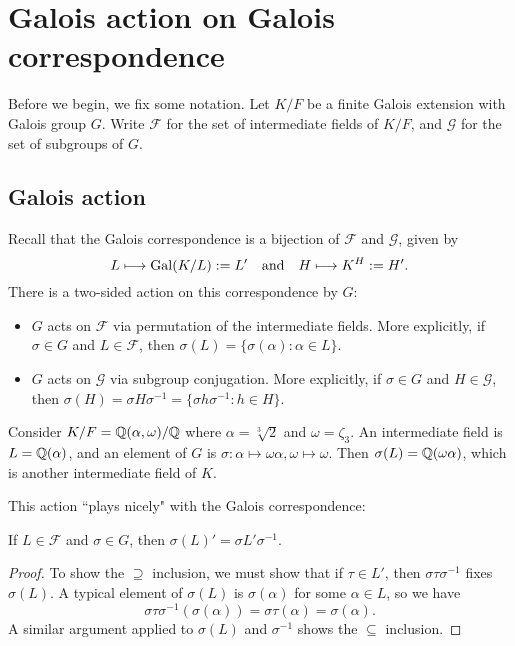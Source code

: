 \chapter{Galois action on Galois correspondence}

Before we begin, we fix some notation. Let $K/F$ be a finite Galois extension with Galois group $G$. Write $\mathcal{F}$ for the set of intermediate fields of $K/F$, and $\mathcal{G}$ for the set of subgroups of $G$.

\section{Galois action}

Recall that the Galois correspondence is a bijection of $\mathcal{F}$ and $\mathcal{G}$, given by
\[
    L \longmapsto \operatorname{Gal}(K/L) := L' \quad \text{and} \quad H \longmapsto K^H := H'.
\]
There is a two-sided action on this correspondence by $G$:
\begin{itemize}
    \item $G$ acts on $\mathcal{F}$ via permutation of the intermediate fields. More explicitly, if $\sigma \in G$ and $L \in \mathcal{F}$, then $\sigma(L) = \{\sigma(\alpha): \alpha \in L\}$.
    \item $G$ acts on $\mathcal{G}$ via subgroup conjugation. More explicitly, if $\sigma \in G$ and $H \in \mathcal{G}$, then $\sigma(H) = \sigma H \sigma^{-1} = \{\sigma h \sigma^{-1}: h \in H\}$.
\end{itemize}

\begin{example}
\label{exmp_gal_action_on_field}
    Consider $K/F = \mathbb{{Q}}(\alpha, \omega)/\mathbb{{Q}}$ where $\alpha = \sqrt[3]{2}$ and $\omega = \zeta_3$. An intermediate field is $L = \mathbb{{Q}}(\alpha)$, and an element of $G$ is $\sigma: \alpha \mapsto \omega \alpha, \omega \mapsto \omega$. Then $\sigma(L) = \mathbb{{Q}}(\omega \alpha)$, which is another intermediate field of $K$.
\end{example}

This action ``plays nicely" with the Galois correspondence:

\begin{proposition}
\label{prop_gal_action_subgrp_conj}
    If $L \in \mathcal{F}$ and $\sigma \in G$, then $\sigma(L)' = \sigma L' \sigma^{-1}$.
\end{proposition}

\begin{proof}
    To show the $\supseteq$ inclusion, we must show that if $\tau \in L'$, then $\sigma \tau \sigma^{-1}$ fixes $\sigma(L)$. A typical element of $\sigma(L)$ is $\sigma(\alpha)$ for some $\alpha \in L$, so we have
    \[
        \sigma \tau \sigma^{-1}(\sigma(\alpha)) = \sigma \tau(\alpha) = \sigma(\alpha).
    \]
    A similar argument applied to $\sigma(L)$ and $\sigma^{-1}$ shows the $\subseteq$ inclusion.
\end{proof}

